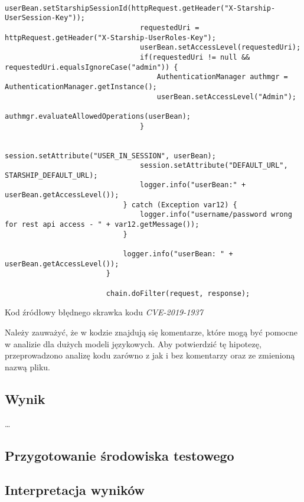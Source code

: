 \begin{listing}
\begin{verbatim}
                                userBean.setStarshipSessionId(httpRequest.getHeader("X-Starship-UserSession-Key"));
                                requestedUri = httpRequest.getHeader("X-Starship-UserRoles-Key");
                                userBean.setAccessLevel(requestedUri);
                                if(requestedUri != null && requestedUri.equalsIgnoreCase("admin")) {
                                    AuthenticationManager authmgr = AuthenticationManager.getInstance();
                                    userBean.setAccessLevel("Admin");
                                    authmgr.evaluateAllowedOperations(userBean);
                                }

                                session.setAttribute("USER_IN_SESSION", userBean);
                                session.setAttribute("DEFAULT_URL", STARSHIP_DEFAULT_URL);
                                logger.info("userBean:" + userBean.getAccessLevel());
                            } catch (Exception var12) {
                                logger.info("username/password wrong for rest api access - " + var12.getMessage());
                            }

                            logger.info("userBean: " + userBean.getAccessLevel());
                        }

                        chain.doFilter(request, response);
\end{verbatim}
\caption{Kod źródłowy błędnego skrawka kodu \textit{CVE-2019-1937}}
\label{lst:code1}
\end{listing}

\restoregeometry

Należy zauważyć, że w kodzie znajdują się komentarze, które mogą być pomocne w analizie dla dużych modeli językowych. 
Aby potwierdzić tę hipotezę, przeprowadzono analizę kodu zarówno z jak i bez komentarzy oraz ze zmienioną nazwą pliku.

\subsection{Wynik}
\dots

\subsection{Przygotowanie środowiska testowego}

\subsection{Interpretacja wyników}
\label{subsec:interpretacja_wynikow}

